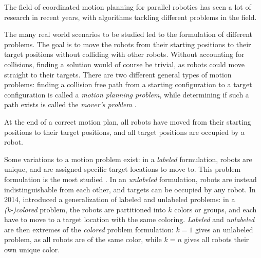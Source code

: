 The field of coordinated motion planning for parallel robotics has seen a lot of research in recent years, with algorithms tackling different problems in the field. 

The many real world scenarios to be studied led to the formulation of different problems.
The goal is to move the robots from their starting positions to their target positions without colliding with other robots.
Without accounting for collisions, finding a solution would of course be trivial, as robots could move straight to their targets.
There are two different general types of motion problems: finding a collision free path from a starting configuration to a target configuration is called a \emph{motion planning problem}, while determining if such a path exists is called the \emph{mover's problem} \cite{hopcroftReducingMultipleObject1986}. 

At the end of a correct motion plan, all robots have moved from their starting positions to their target positions, and all target positions are occupied by a robot.  

Some variations to a motion problem exist:
in a \emph{labeled} formulation, robots are unique, and are assigned specific target locations to move to. 
This problem formulation is the most studied \cite{fun/BrockenHKLS21}.
In an \emph{unlabeled} formulation, robots are instead indistinguishable from each other, and targets can be occupied by any robot. 
In 2014, \cite{soloveyColorMultirobotMotion2014} introduced a generalization of labeled and unlabeled problems: in a \emph{(k-)colored} problem, the robots are partitioned into $k$ colors or groups, and each have to move to a target location with the same coloring. 
\emph{Labeled} and \emph{unlabeled} are then extremes of the \emph{colored} problem formulation: 
$k=1$ gives an unlabeled problem, as all robots are of the same color, while $k=n$ gives all robots their own unique color. 


